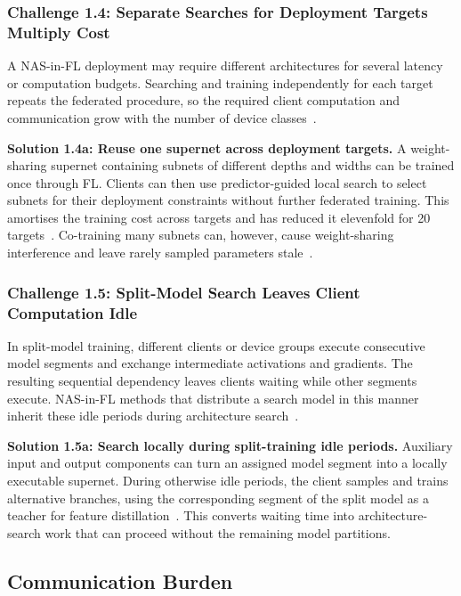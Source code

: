 \subsubsection{Challenge 1.4: Separate Searches for Deployment Targets Multiply Cost}

A NAS-in-FL deployment may require different architectures for several latency or computation budgets. Searching and training independently for each target repeats the federated procedure, so the required client computation and communication grow with the number of device classes~\cite{superfednas_2024}.

\noindent\textbf{Solution 1.4a: Reuse one supernet across deployment targets.} A weight-sharing supernet containing subnets of different depths and widths can be trained once through FL. Clients can then use predictor-guided local search to select subnets for their deployment constraints without further federated training. This amortises the training cost across targets and has reduced it elevenfold for 20 targets~\cite{superfednas_2024}. Co-training many subnets can, however, cause weight-sharing interference and leave rarely sampled parameters stale~\cite{superfednas_2024}.

\subsubsection{Challenge 1.5: Split-Model Search Leaves Client Computation Idle}

In split-model training, different clients or device groups execute consecutive model segments and exchange intermediate activations and gradients. The resulting sequential dependency leaves clients waiting while other segments execute. NAS-in-FL methods that distribute a search model in this manner inherit these idle periods during architecture search~\cite{nasfly_2024}.

\noindent\textbf{Solution 1.5a: Search locally during split-training idle periods.} Auxiliary input and output components can turn an assigned model segment into a locally executable supernet. During otherwise idle periods, the client samples and trains alternative branches, using the corresponding segment of the split model as a teacher for feature distillation~\cite{nasfly_2024}. This converts waiting time into architecture-search work that can proceed without the remaining model partitions.

\subsection{Communication Burden}

